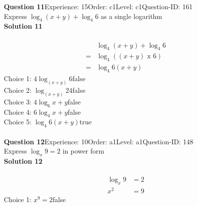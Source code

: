 \documentclass{article}
\begin{document}
\noindent\textbf{Question 11}\hspace{20pt}Experience: 15\hspace{20pt}Order: c1\hspace{20pt}Level: c1\hspace{20pt}Question-ID: 161\\[2pt]
Express $\log_{4}(x+y)+\log_{4}6$ as a single logarithm\\[4pt]
\noindent\textbf{Solution 11}\\[2pt]
\\[-35pt]\begin{align*}
&\log_{4}(x+y)+\log_{4}6\\[2pt]
=&\log_{4}((x+y) \,\, \text{x} \,\, 6)\\[2pt]
=&\log_{4}6(x+y)
\end{align*}
Choice 1: \hspace{20pt}$4\log_{(x+y)}6$\hspace{20pt}false\\
Choice 2: \hspace{20pt}$\log_{(x+y)}24$\hspace{20pt}false\\
Choice 3: \hspace{20pt}$4\log_{6}x+y$\hspace{20pt}false\\
Choice 4: \hspace{20pt}$6\log_{4}x+y$\hspace{20pt}false\\
Choice 5: \hspace{20pt}$\log_{4}6(x+y)$\hspace{20pt}true\\
\\[4pt]
\noindent\textbf{Question 12}\hspace{20pt}Experience: 10\hspace{20pt}Order: a1\hspace{20pt}Level: a1\hspace{20pt}Question-ID: 148\\[2pt]
Express $\log_x9=2$ in power form\\[4pt]
\noindent\textbf{Solution 12}\\[2pt]
\\[-35pt]\begin{align*}
\log_x9&=2\\[2pt]
x^2&=9
\end{align*}
Choice 1: \hspace{20pt}$x^9=2$\hspace{20pt}false\\
\end{document}
